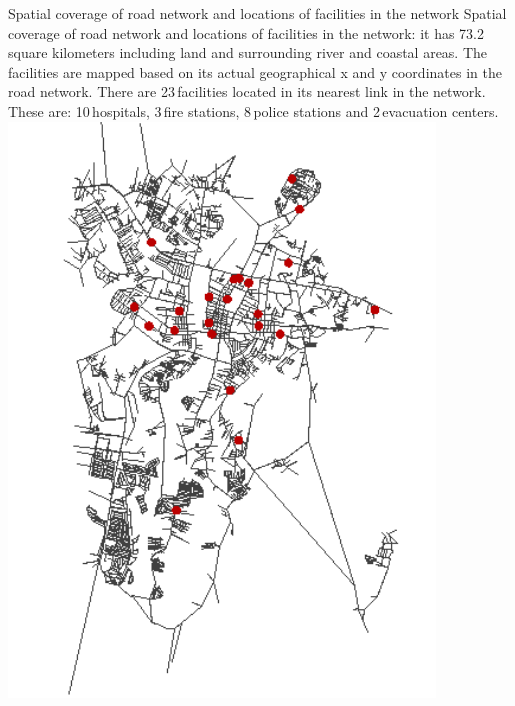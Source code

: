 \createfigure%
{Spatial coverage of road network and locations of facilities in the network}%
{Spatial coverage of road network and locations of facilities in the network: it has 73.2\,square kilometers including land and surrounding river and coastal areas. The facilities are mapped based on its actual geographical x and y coordinates in the road network. There are 23\,facilities located in its nearest link in the network. These are: 10\,hospitals, 3\,fire stations, 8\,police stations and 2\,evacuation centers.}%
{\label{fig:philippines_fig3}}%
{\includegraphics[width=0.85\textwidth, angle=0]{./using/figures/philippines_fig3.png}}%
{}

